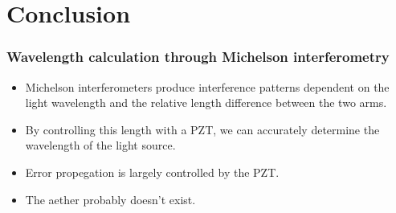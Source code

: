 \documentclass{beamer}
\begin{document}
\section{Conclusion}

\begin{frame}
  \frametitle{Wavelength calculation through Michelson interferometry}
  \begin{itemize}
    \pause
    \item Michelson interferometers produce interference patterns dependent on the light wavelength and the relative length difference between the two arms.
      \pause
    \item By controlling this length with a PZT, we can accurately determine the wavelength of the light source.
      \pause
    \item Error propegation is largely controlled by the PZT.
      \pause
    \item The aether probably doesn't exist.
  \end{itemize}
\end{frame}
\end{document}
